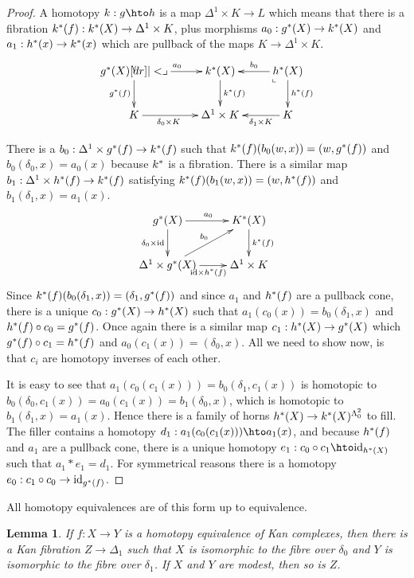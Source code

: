 \documentclass{amsart}
\theoremstyle{plain}
\newtheorem{lemma}[theorem]{Lemma}
\theoremstyle{definition}
\newcommand\id{\mathrm{id}}
\begin{document}
\begin{proof} A homotopy $k:g\hto h$ is a map $\Delta^1\times K \to L$ which means that there is a fibration $k^*(f):k^*(X) \to \Delta^1\times K$, plus morphisms $a_0:g^*(X) \to k^*(X)$ and $a_1:h^*(x) \to k^*(x)$ which are pullback of the maps $K \to \Delta^1\times K$.
\[\xymatrix{
g\ri(X) \ar[r]^{a_0}\ar[d]_{g\ri(f)} \pb & k\ri(X) \ar[d]^{k\ri(f)} & h\ri(X) \ar[l]_{b_0} \ar[d]^{h\ri(f)} \ar@{}[dl]|<\llcorner \\
K \ar[r]_(.4){\delta_0\times K} & \Delta^1\times K & K \ar[l]^(.4){\delta_1\times K}
}\]

There is a $b_0:\Delta^1\times g^*(f) \to k^*(f)$ such that $k^*(f)(b_0(w,x)) = (w,g^*(f))$ and $b_0(\delta_0,x) = a_0(x)$ because $k^*$ is a fibration. There is a similar map $b_1:\Delta^1\times h^*(f) \to k^*(f)$ satisfying  $k^*(f)(b_1(w,x)) = (w,h^*(f))$ and $b_1(\delta_1,x) = a_1(x)$.
\[\xymatrix{
g\ri(X) \ar[d]_{\delta_0\times \id} \ar[r]^{a_0} & K\ri(X)\ar[d]^{k\ri(f)}\\
\Delta^1\times g\ri(X) \ar[r]_{\id\times h\ri(f)} \ar[ur]^{b_0} & \Delta^1\times K
}\]
Since $k^*(f)( b_0(\delta_1, x) ) = (\delta_1,g^*(f))$ and since $a_1$ and $h^*(f)$ are a pullback cone, there is a unique $c_0:g^*(X)\to h^*(X)$ such that $a_1(c_0(x)) = b_0(\delta_1, x)$ and $h^*(f)\circ c_0 = g^*(f)$. Once again there is a similar map $c_1:h^*(X)\to g^*(X)$ which $g^*(f)\circ c_1 = h^*(f)$ and $a_0(c_1(x)) = (\delta_0,x)$. All we need to show now, is that $c_i$ are homotopy inverses of each other.

It is easy to see that $a_1(c_0(c_1(x))) = b_0(\delta_1,c_1(x))$ is homotopic to $b_0(\delta_0,c_1(x)) = a_0(c_1(x)) = b_1(\delta_0,x)$, which is homotopic to $b_1(\delta_1,x) = a_1(x)$. Hence there is a family of horns $h^*(X) \to k^*(X)^{\Lambda^2_0}$ to fill. The filler contains a homotopy $d_1:a_1(c_0(c_1(x))) \hto a_1(x)$, and because $h^*(f)$ and $a_1$ are a pullback cone, there is a unique homotopy $e_1:c_0\circ c_1\hto \id_{h\ri(X)}$ such that $a_1*e_1 = d_1$. For symmetrical reasons there is a homotopy $e_0:c_1\circ c_0 \to \id_{g\ri(f)}$.
\end{proof}

All homotopy equivalences are of this form up to equivalence.

\begin{lemma} If $f:X\to Y$ is a homotopy equivalence of Kan complexes, then there is a Kan fibration $Z\to\Delta_1$ such that $X$ is isomorphic to the fibre over $\delta_0$ and $Y$ is isomorphic to the fibre over $\delta_1$. If $X$ and $Y$ are modest, then so is $Z$. \label{hetoh} \end{lemma}
\end{document}
